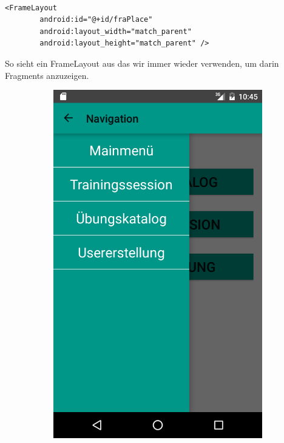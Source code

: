 \documentclass[FIPLY_base.tex]{subfiles}
\begin{document}
\ \\
\begin{lstlisting}
<FrameLayout
        android:id="@+id/fraPlace"
        android:layout_width="match_parent"
        android:layout_height="match_parent" />
\end{lstlisting}
So sieht ein FrameLayout aus das wir immer wieder verwenden, um darin Fragments anzuzeigen.

\newpage
\begin{figure}[t] %
	\begin{subfigure}[h]{0.3\textwidth}
	\includegraphics[scale=0.20]{img/NavigationDrawer}

\end{subfigure}
\end{figure}
\end{document}
